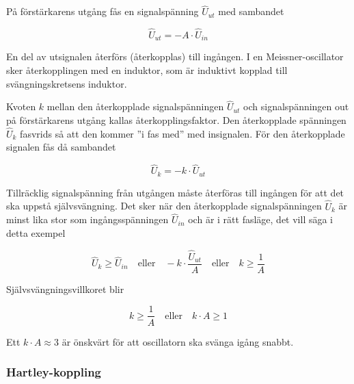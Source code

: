 På förstärkarens utgång fås en signalspänning \(\hat{U}_{ut}\) med sambandet

\[\hat{U}_{ut} = -A \cdot \hat{U}_{in}\]

En del av utsignalen återförs (återkopplas) till ingången.
I en Meissner-oscillator sker återkopplingen med en induktor, som är
induktivt kopplad till svängningskretsens induktor.

Kvoten \(k\) mellan den återkopplade signalspänningen \(\hat{U}_{ut}\) och
signalspänningen out på förstärkarens utgång kallas återkopplingsfaktor.
Den återkopplade spänningen \(\hat{U}_k\) fasvrids så att den kommer
''i fas med'' med insignalen.
För den återkopplade signalen fås då sambandet

\[\hat{U}_k = -k \cdot \hat{U}_{ut}\]

Tillräcklig signalspänning från utgången måste återföras till ingången
för att det ska uppstå självsvängning.
Det sker när den återkopplade signalspänningen \(\hat{U}_k\) är minst lika stor
som ingångsspänningen \(\hat{U}_{in}\) och är i rätt fasläge, det vill säga i
detta exempel

\[
\hat{U}_k \geq \hat{U}_{in}
\quad \text{eller} \quad
-k \cdot \frac{\hat{U}_{ut}}{A}
\quad \text{eller} \quad
k \geq \frac{1}{A}
\]

Självsvängningsvillkoret blir

\[
k \geq \frac{1}{A}
\quad \text{eller} \quad
k \cdot A \geq 1
\]

Ett \(k \cdot A \approx 3\) är önskvärt för att oscillatorn ska svänga igång
snabbt.

\subsubsection{Hartley-koppling}


